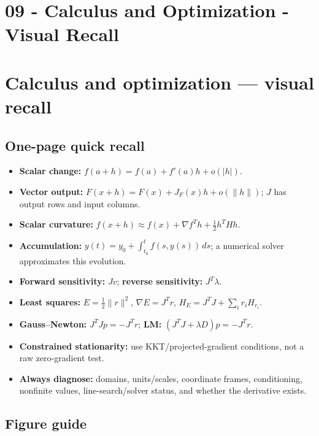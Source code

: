 \hypertarget{appendix-adf48f5dc5c1}{}
\section*{09 - Calculus and Optimization - Visual Recall}
\section{Calculus and optimization --- visual recall}\label{calculus-and-optimization-visual-recall}

\subsection{One-page quick recall}\label{one-page-quick-recall}

\begin{itemize}
\tightlist
\item
  \textbf{Scalar change:} \(f(a+h)=f(a)+f'(a)h+o(|h|)\).
\item
  \textbf{Vector output:} \(F(x+h)=F(x)+J_F(x)h+o(\|h\|)\); \(J\) has output rows and input columns.
\item
  \textbf{Scalar curvature:} \(f(x+h)\approx f(x)+\nabla f^T h+\tfrac12h^THh\).
\item
  \textbf{Accumulation:} \(y(t)=y_0+\int_{t_0}^t f(s,y(s))\,ds\); a numerical solver approximates this evolution.
\item
  \textbf{Forward sensitivity:} \(Jv\); \textbf{reverse sensitivity:} \(J^T\lambda\).
\item
  \textbf{Least squares:} \(E=\tfrac12\|r\|^2\), \(\nabla E=J^Tr\), \(H_E=J^TJ+\sum_i r_iH_{r_i}\).
\item
  \textbf{Gauss--Newton:} \(J^TJp=-J^Tr\); \textbf{LM:} \((J^TJ+\lambda D)p=-J^Tr\).
\item
  \textbf{Constrained stationarity:} use KKT/projected-gradient conditions, not a raw zero-gradient test.
\item
  \textbf{Always diagnose:} domains, units/scales, coordinate frames, conditioning, nonfinite values, line-search/solver status, and whether the derivative exists.
\end{itemize}

\subsection{Figure guide}\label{figure-guide}

